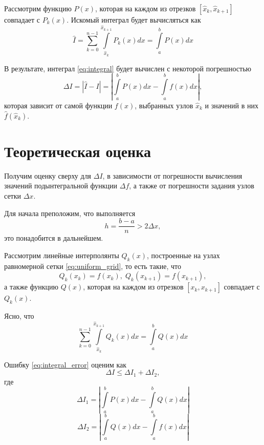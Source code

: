 \documentclass[10pt, twocolumn]{article}
\begin{document}
Рассмотрим функцию $P(x)$, которая на каждом из отрезков $[\hat{x}_k, \hat{x}_{k + 1}]$ совпадает с $P_k(x)$. Искомый интеграл будет вычисляться как
\begin{equation*}
  \hat{I} = \sum \limits_{k = 0}^{n - 1} \int \limits_{\hat{x}_k}^{\hat{x}_{k+1}} P_k(x) dx = \int \limits_a^b P(x) dx
\end{equation*}

В результате, интеграл \eqref{eq:integral} будет вычислен с некоторой погрешностью
\begin{equation} \label{eq:integral_error}
  \Delta I = |\hat{I} - I| = \left| \int \limits_a^b P(x) dx - \int \limits_a^b f(x) dx \right|,
\end{equation}
которая зависит от самой функции $f(x)$, выбранных узлов $\hat{x}_k$ и значений в них $\hat{f}(\hat{x}_k)$.

\section{Теоретическая оценка}

Получим оценку сверху для $\Delta I$, в зависимости от погрешности вычисления значений подынтегральной функции $\Delta f$, а также от погрешности задания узлов сетки $\Delta x$.

Для начала преположим, что выполняется
\begin{equation*}
  h = \frac{b - a}{n} > 2 \Delta x,
\end{equation*}
это понадобится в дальнейшем.

Рассмотрим линейные интерполянты $Q_k(x)$, построенные на узлах равномерной сетки \eqref{eq:uniform_grid}, то есть такие, что
\begin{equation*}
  Q_k(x_k) = f(x_k), \; Q_k(x_{k + 1}) = f(x_{k + 1}),
\end{equation*}
а также функцию $Q(x)$, которая на каждом из отрезков $[x_k, x_{k + 1}]$ совпадает с $Q_k(x)$.

Ясно, что
\begin{equation*}
  \sum \limits_{k = 0}^{n - 1} \int \limits_{\hat{x}_k}^{\hat{x}_{k + 1}} Q_k(x) dx = \int \limits_a^b Q(x) dx
\end{equation*}

Ошибку \eqref{eq:integral_error} оценим как
\begin{equation} \label{eq:i_i1_i2}
  \Delta I \leq \Delta I_1 + \Delta I_2,
\end{equation}
где
\begin{equation*}
  \Delta I_1 = \left| \int \limits_a^b P(x) dx - \int \limits_a^b Q(x) dx \right|
\end{equation*}
\begin{equation*}
  \Delta I_2 = \left| \int \limits_a^b Q(x) dx - \int \limits_a^b f(x) dx \right|
\end{equation*}
\end{document}
